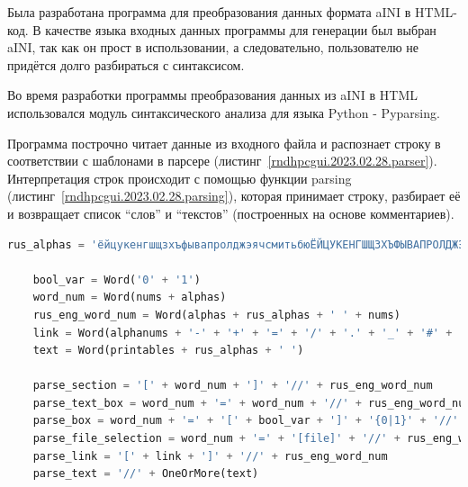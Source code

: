 \def\notedate{2023.02.28}
\def\currentauthor{Василян А.Р. (РК6-83Б)}

Была разработана программа для преобразования данных формата aINI в HTML-код. В качестве языка входных данных программы для генерации был выбран aINI, так как он прост в использовании, а следовательно, пользователю не придётся долго разбираться с синтаксисом.

Во время разработки программы преобразования данных из aINI в HTML использовался модуль синтаксического анализа для языка Python - Pyparsing.

Программа построчно читает данные из входного файла и распознает строку в соответствии с шаблонами в парсере (листинг~\ref{rndhpcgui.2023.02.28.parser}). Интерпретация строк происходит с помощью функции \textsf{parsing} (листинг~\ref{rndhpcgui.2023.02.28.parsing}), которая принимает строку, разбирает её и возвращает список ``слов'' и ``текстов'' (построенных на основе комментариев).%

\begin{lstlisting}[frame=single, label={rndhpcgui.2023.02.28.parser}, caption={Парсер}, language={Python}]
	rus_alphas = 'ёйцукенгшщзхъфывапролджэячсмитьбюЁЙЦУКЕНГШЩЗХЪФЫВАПРОЛДЖЭЯЧСМИТЬБЮ'

	bool_var = Word('0' + '1')
	word_num = Word(nums + alphas)
	rus_eng_word_num = Word(alphas + rus_alphas + ' ' + nums)
	link = Word(alphanums + '-' + '+' + '=' + '/' + '.' + '_' + '#' + ':' + '&' + '?' + '%')
	text = Word(printables + rus_alphas + ' ')
	
	parse_section = '[' + word_num + ']' + '//' + rus_eng_word_num
	parse_text_box = word_num + '=' + word_num + '//' + rus_eng_word_num
	parse_box = word_num + '=' + '[' + bool_var + ']' + '{0|1}' + '//' + rus_eng_word_num
	parse_file_selection = word_num + '=' + '[file]' + '//' + rus_eng_word_num
	parse_link = '[' + link + ']' + '//' + rus_eng_word_num
	parse_text = '//' + OneOrMore(text)
\end{lstlisting}

